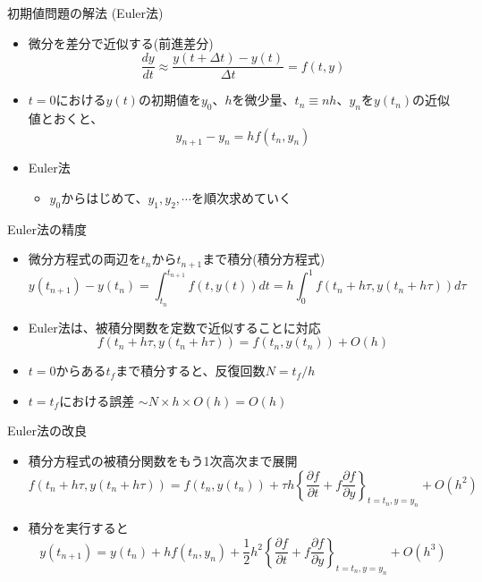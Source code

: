 \documentclass[dvipdfmx]{beamer}
\begin{document}
\begin{frame}[t,fragile]{初期値問題の解法 (Euler法)}
  \begin{itemize}
    \setlength{\itemsep}{1em}
  \item 微分を差分で近似する(前進差分)
    \[
    \frac{dy}{dt} \approx \frac{y(t+\Delta t) - y(t)}{\Delta t} = f(t, y)
    \]
  \item $t=0$における$y(t)$の初期値を$y_0$、$h$を微少量、$t_n \equiv nh$、$y_n$を$y(t_n)$の近似値とおくと、
    \[
    y_{n+1}-y_n = h f( t_n, y_n)
    \]
  \item Euler法
    \begin{itemize}
    \item $y_0$からはじめて、$y_1,y_2,\cdots$を順次求めていく
    \end{itemize}
  \end{itemize}
\end{frame}

\begin{frame}[t,fragile]{Euler法の精度}
  \begin{itemize}
    \setlength{\itemsep}{1em}
  \item 微分方程式の両辺を$t_n$から$t_{n+1}$まで積分(積分方程式)
    \[
    y(t_{n+1}) - y(t_n) = \int^{t_{n+1}}_{t_n} \!\! f(t, y(t)) dt = h \int^1_0 \! f(t_n+h\tau, y(t_n+h\tau)) d\tau
    \]
  \item Euler法は、被積分関数を定数で近似することに対応
    \[
    f(t_n+h\tau, y(t_n+h\tau)) = f(t_n, y(t_n)) + O(h)
    \]
  \item $t=0$からある$t_f$まで積分すると、反復回数$N = t_f / h$
  \item $t=t_f$における誤差 $\sim N \times h \times O(h) = O(h)$
  \end{itemize}
\end{frame}

\begin{frame}[t,fragile]{Euler法の改良}
  \begin{itemize}
    \setlength{\itemsep}{1em}
  \item 積分方程式の被積分関数をもう1次高次まで展開
    \[
    f(t_n+h\tau, y(t_n+h\tau)) = f(t_n, y(t_n)) +
    \tau h
    \left\{
    \frac{\partial f}{\partial t}
    + f \frac{\partial f}{\partial y}
    \right\}_{t=t_n, y=y_n}
    \!\!\!\!\!\!\!\!\!\!\!\! + O(h^2)
    \]
  \item 積分を実行すると
    \[
    y(t_{n+1}) = y(t_n) + h f(t_n, y_n) + \frac{1}{2}h^2
    \left\{
    \frac{\partial f}{\partial t}
    + f \frac{\partial f}{\partial y}
    \right\}_{t=t_n, y=y_n}
    \!\!\!\!\!\!\!\!\!\!\!\! + O(h^3)
    \]
  \end{itemize}
\end{frame}
\end{document}
